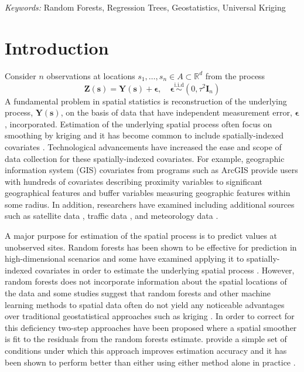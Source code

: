 \documentclass[12pt]{article}
\newcommand{\proc}{\mathbf{Y}(\mathbf{s})}
\newcommand{\obs}{\mathbf{Z}(\mathbf{s})}
\newcommand{\nggt}{\boldsymbol{\epsilon}}
\newcommand{\eye}{\mathbf{I} }
\begin{document}
\noindent%
{\it Keywords:} Random Forests, Regression Trees, Geostatistics, Universal Kriging
\vfill

\newpage
{} %
\section{Introduction}
\label{sec:intro}

Consider $n$ observations at locations $s_1,\ldots,s_n \in A \subset \mathbb{R}^d$ from the process
$$ \obs = \proc + \nggt, \quad \nggt \overset{\text{i.i.d}}{\sim} (0,\tau^2 \eye_n)$$
A fundamental problem in spatial statistics is reconstruction of the underlying process, $\proc$, on the basis of data that have independent measurement error, $\nggt$, incorporated. 
 Estimation of the underlying spatial process often focus on smoothing by kriging \citep{matheron1963principles} and it has become common to include spatially-indexed covariates  \citep{hengl2007regression}. Technological advancements have increased the ease and scope of data collection for these spatially-indexed covariates. For example, geographic information system (GIS) covariates from programs such as ArcGIS provide users with hundreds of covariates describing proximity variables to significant geographical features and buffer variables measuring geographic features within some radius. In addition, researchers have examined including additional sources such as satellite data \citep{xu2018national}, traffic data \citep{saucy2018land}, and meteorology data \citep{arain2007use}. 

A major purpose for estimation of the spatial process is to predict values at unobserved sites. Random forests \citep{breiman2001random} has been shown to be effective for prediction in high-dimensional scenarios and some have examined applying it to spatially-indexed covariates in order to estimate the underlying spatial process \citep{hu2017estimating,chen2018machine}. However, random forests does not incorporate information about the spatial locations of the data and some studies suggest that random forests and other machine learning methods to spatial data often do not yield any noticeable advantages over traditional geostatistical approaches such as kriging \citep{fox2018comparing,berrocal2019comparison}. In order to correct for this deficiency two-step approaches have been proposed where a spatial smoother is fit to the residuals from the random forests estimate. \cite{rolf2020post} provide a simple set of conditions under which this approach improves estimation accuracy and it has been shown to perform better than either using either method alone in practice \citep{liu2018improve}.  
\end{document}
